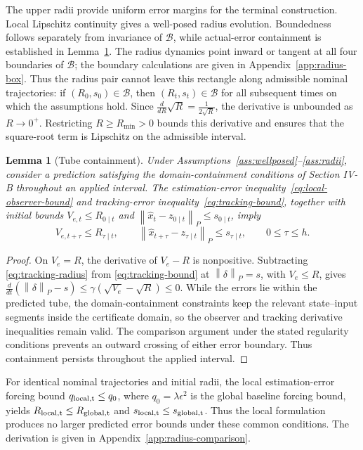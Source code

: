 \documentclass[11pt,a4paper]{article}
\numberwithin{equation}{section}
\newtheorem{lemma}{Lemma}
\theoremstyle{remark}\newtheorem{remark}{Remark}
\newcommand{\norm}[1]{\left\lVert#1\right\rVert}
\begin{document}
The upper radii provide uniform error margins for the terminal construction. Local Lipschitz continuity gives a well-posed radius evolution. Boundedness follows separately from invariance of $\mathcal B$, while actual-error containment is established in Lemma~\ref{lem:tube}. The radius dynamics point inward or tangent at all four boundaries of $\mathcal B$; the boundary calculations are given in Appendix~\ref{app:radius-box}. Thus the radius pair cannot leave this rectangle along admissible nominal trajectories: if $(R_{0},s_{0})\in\mathcal B$, then $(R_{t},s_{t})\in\mathcal B$ for all subsequent times on which the assumptions hold. Since $\frac{d}{dR}\sqrt R=\frac{1}{2\sqrt R}$, the derivative is unbounded as $R\to0^+$. Restricting $R\ge R_{\min}>0$ bounds this derivative and ensures that the square-root term is Lipschitz on the admissible interval.

\begin{lemma}[Tube containment]\label{lem:tube}
Under Assumptions~\ref{ass:wellposed}--\ref{ass:radii}, consider a prediction satisfying the domain-containment conditions of Section IV-B throughout an applied interval. The estimation-error inequality~\eqref{eq:local-observer-bound} and tracking-error inequality~\eqref{eq:tracking-bound}, together with initial bounds $V_{e,t}\le R_{0\mid t}$ and $\norm{\hat x_t-z_{0\mid t}}_P\le s_{0\mid t}$, imply
\[
V_{e,t+\tau}\le R_{\tau\mid t},\qquad
\norm{\hat x_{t+\tau}-z_{\tau\mid t}}_P\le s_{\tau\mid t},
\qquad 0\le\tau\le h.
\]
\end{lemma}
\begin{proof}
On $V_e=R$, the derivative of $V_e-R$ is nonpositive. Subtracting \eqref{eq:tracking-radius} from \eqref{eq:tracking-bound} at $\norm\delta_P=s$, with $V_e\le R$, gives
$\frac{d}{dt}(\norm\delta_P-s)\le\gamma(\sqrt{V_e}-\sqrt R)\le0$.
While the errors lie within the predicted tube, the domain-containment constraints keep the relevant state--input segments inside the certificate domain, so the observer and tracking derivative inequalities remain valid. The comparison argument under the stated regularity conditions prevents an outward crossing of either error boundary. Thus containment persists throughout the applied interval.
\end{proof}
For identical nominal trajectories and initial radii, the local estimation-error forcing bound $q_{\rm local,t}\le q_0$, where $q_0=\lambda\epsilon^2$ is the global baseline forcing bound, yields $R_{\rm local,t}\le R_{\rm global,t}$ and $s_{\rm local,t}\le s_{\rm global,t}$. Thus the local formulation produces no larger predicted error bounds under these common conditions. The derivation is given in Appendix~\ref{app:radius-comparison}.
\end{document}
